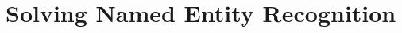 \documentclass[10pt,=table]{beamer}
\begin{document}
%
%

\section[Applications to NLP]{Solving Named Entity Recognition}
\end{document}
